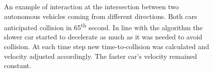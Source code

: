 \documentclass[11pt,english]{article}
\begin{document}
\begin{figure}[!] %
\caption{An example of interaction at the intersection between two autonomous vehicles coming from different directions. Both cars anticipated collision in 65\textsuperscript{th} second. In line with the algorithm the slower car started to decelerate as much as it was needed to avoid collision. At each time step new time-to-collision was calculated and velocity adjusted accordingly. The faster car's velocity remained constant.}
\label{fig:interactions_example_2}
\end{figure}















\end{document}
